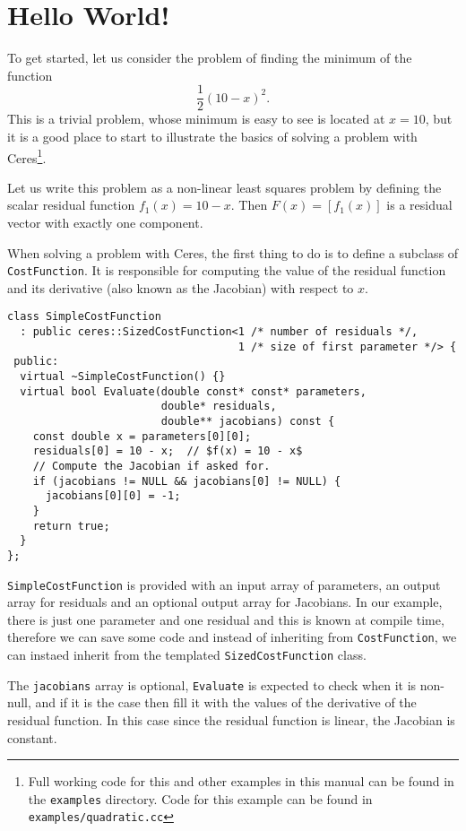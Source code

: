 \chapter{Hello World!}
\label{chapter:tutorial:helloworld}
To get started, let us consider the problem of finding the minimum of the function
\begin{equation}
 \frac{1}{2}(10 -x)^2.
\end{equation}
This is a trivial problem, whose minimum is easy to see is located at $x = 10$, but it is a good place to start to illustrate the basics of solving a problem with Ceres\footnote{Full working code for this and other examples in this manual can be found in the \texttt{examples} directory. Code for this example can be found in \texttt{examples/quadratic.cc}}. 


Let us write this problem as a non-linear least squares problem by defining the scalar residual function $f_1(x) = 10 - x$. Then $F(x) = [f_1(x)]$ is a residual vector with exactly one component.

When solving a problem with Ceres, the first thing to do is to define a subclass of \texttt{CostFunction}. It is responsible for computing the value of the residual function and its derivative (also known as the Jacobian) with respect to $x$.
\begin{verbatim}
class SimpleCostFunction
  : public ceres::SizedCostFunction<1 /* number of residuals */,
                                    1 /* size of first parameter */> {
 public:
  virtual ~SimpleCostFunction() {}
  virtual bool Evaluate(double const* const* parameters,
                        double* residuals,
                        double** jacobians) const {
    const double x = parameters[0][0];
    residuals[0] = 10 - x;  // $f(x) = 10 - x$
    // Compute the Jacobian if asked for.
    if (jacobians != NULL && jacobians[0] != NULL) {
      jacobians[0][0] = -1;
    }
    return true;
  }
};
\end{verbatim}
\texttt{SimpleCostFunction} is provided with an input array of parameters, an output array for residuals and an optional output array for Jacobians. In our example, there is just one parameter and one residual and this is known at compile time, therefore we can save some code and instead of inheriting from \texttt{CostFunction}, we can instaed inherit from the templated \texttt{SizedCostFunction} class. 


The \texttt{jacobians} array is optional, \texttt{Evaluate} is expected to check when it is non-null, and if it is the case then fill it with the values of the derivative of the residual function. In this case since the residual function is linear, the Jacobian is constant.

